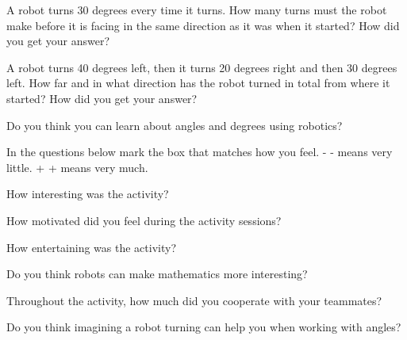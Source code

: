 \documentclass[12pt]{exam}
\begin{document}
\begin{questions}
\newpage

\question A robot turns 30 degrees every time it turns. How many turns must the robot make before it is facing in the same direction as it was when it started? How did you get your answer?

\pairspace
\pairspace
\pairspace

\question A robot turns 40 degrees left, then it turns 20 degrees right and then 30 degrees left. How far and in what direction has the robot turned in total from where it started? How did you get your answer?

\pairspace
\pairspace
\pairspace
	
\question Do you think you can learn about angles and degrees using robotics?
\pairspace

\newpage
In the questions below mark the box that matches how you feel.
\newline - - means very little. 
\newline + + means very much.

\question How interesting was the activity?
\newline\feels

\question How motivated did you feel during the activity sessions?
\newline\feels

\question How entertaining was the activity?
\newline\feels

\question Do you think robots can make mathematics more interesting?
\newline\feels

\question Throughout the activity, how much did you cooperate with your teammates?
\newline\feels

\question Do you think imagining a robot turning can help you when working with angles?
\newline\feels

\end{questions}
\end{document}
